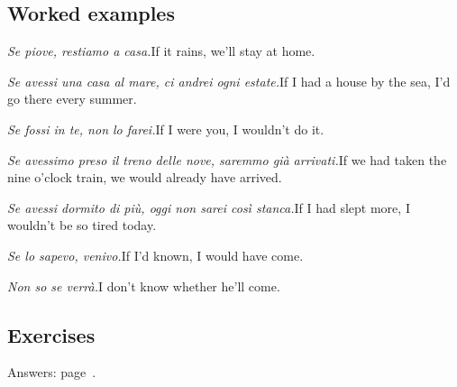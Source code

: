 \documentclass[11pt,a4paper,twoside,openright]{book}
\begin{document}
\subsection*{Worked examples}
\begin{examples}
\item\relax \textit{Se piove, restiamo a casa.}\newline If it rains, we'll stay at home.
\item\relax \textit{Se avessi una casa al mare, ci andrei ogni estate.}\newline If I had a house by the sea, I'd go there every summer.
\item\relax \textit{Se fossi in te, non lo farei.}\newline If I were you, I wouldn't do it.
\item\relax \textit{Se avessimo preso il treno delle nove, saremmo già arrivati.}\newline If we had taken the nine o'clock train, we would already have arrived.
\item\relax \textit{Se avessi dormito di più, oggi non sarei così stanca.}\newline If I had slept more, I wouldn't be so tired today.
\item\relax \textit{Se lo sapevo, venivo.}\newline If I'd known, I would have come.
\item\relax \textit{Non so se verrà.}\newline I don't know whether he'll come.
\end{examples}

\subsection*{Exercises}\label{les:periodo-ipotetico:exercises}
{\color{muted}\small Answers: page~\pageref{ans:periodo-ipotetico}.}
\end{document}
